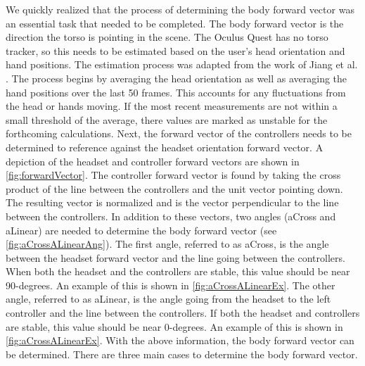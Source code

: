 \documentclass{vgtc}                          %
\begin{document}
We quickly realized that the process of determining the body forward vector was an essential task that needed to be completed. The body forward vector is the direction the torso is pointing in the scene. The Oculus Quest has no torso tracker, so this needs to be estimated based on the user’s head orientation and hand positions. The estimation process was adapted from the work of Jiang et al. \cite{Real-Time}. The process begins by averaging the head orientation as well as averaging the hand positions over the last 50 frames. This accounts for any fluctuations from the head or hands moving. If the most recent measurements are not within a small threshold of the average, there values are marked as unstable for the forthcoming calculations. Next, the forward vector of the controllers needs to be determined to reference against the headset orientation forward vector. A depiction of the headset and controller forward vectors are shown in \autoref{fig:forwardVector}. The controller forward vector is found by taking the cross product of the line between the controllers and the unit vector pointing down. The resulting vector is normalized and is the vector perpendicular to the line between the controllers. In addition to these vectors, two angles (aCross and aLinear) are needed to determine the body forward vector (see \autoref{fig:aCrossALinearAng}). The first angle, referred to as aCross, is the angle between the headset forward vector and the line going between the controllers. When both the headset and the controllers are stable, this value should be near 90-degrees. An example of this is shown in \autoref{fig:aCrossALinearEx}. The other angle, referred to as aLinear, is the angle going from the headset to the left controller and the line between the controllers. If both the headset and controllers are stable, this value should be near 0-degrees. An example of this is shown in \autoref{fig:aCrossALinearEx}. With the above information, the body forward vector can be determined. There are three main cases to determine the body forward vector. 
\end{document}
